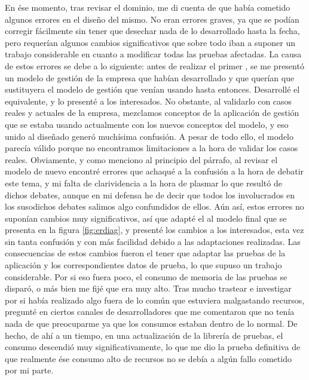 En ése momento, tras revisar el dominio, me di cuenta de que había cometido algunos
errores en el diseño del mismo. No eran errores graves, ya que se podían corregir
fácilmente sin tener que desechar nada de lo desarrollado hasta la fecha, pero requerían
algunos cambios significativos que sobre todo iban a suponer un trabajo considerable
en cuanto a modificar todas las pruebas afectadas. La causa de estos errores se debe a lo siguiente:
antes de realizar el primer ,
se me presentó un modelo de gestión de la empresa que habían desarrollado y que querían
que sustituyera el modelo de gestión que venían usando hasta entonces. Desarrollé el
 equivalente, y lo presenté a los interesados.
No obstante, al validarlo con casos reales y actuales de la empresa, mezclamos conceptos
de la aplicación de gestión que se estaba usando actualmente con los nuevos conceptos del modelo,
y eso unido al  diseñado generó muchísima confusión.
A pesar de todo ello, el modelo parecía válido porque no encontramos limitaciones a la hora
de validar los casos reales. Obviamente, y como menciono al principio del párrafo, al revisar
el modelo de nuevo encontré errores que achaqué a la confusión a la hora de debatir este tema,
y mi falta de clarividencia a la hora de plasmar lo que resultó de dichos
debates, aunque en mi defensa he de decir que todos los involucrados en los susodichos debates
salimos algo confundidos de ellos. Aún así, estos errores no suponían cambios muy
significativos, así que adapté el  al modelo
final que se presenta en la figura \ref{fig:erdiag}, y presenté los cambios a los interesados,
esta vez sin tanta confusión y con más facilidad debido a las adaptaciones realizadas. Las
consecuencias de estos cambios fueron el tener que adaptar las pruebas de la aplicación y los
correspondientes datos de prueba, lo que supuso un trabajo considerable. Por si eso fuera poco,
el consumo de memoria de las pruebas se disparó, o más bien me fijé que era muy alto. Tras
mucho trastear e investigar por si había realizado algo fuera de lo común que estuviera
malgastando recursos, pregunté en ciertos canales de desarrolladores que me comentaron que
no tenía nada de que preocuparme ya que los consumos estaban dentro de lo normal. De hecho,
de ahí a un tiempo, en una actualización de la librería de pruebas, el consumo descendió muy
significativamente, lo que me dio la prueba definitiva de que realmente ése consumo alto de
recursos no se debía a algún fallo cometido por mi parte.


